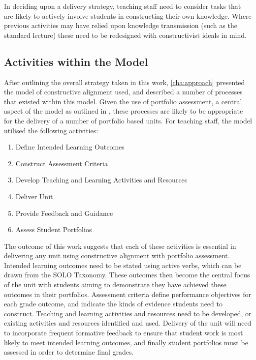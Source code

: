 In deciding upon a delivery strategy, teaching staff need to consider tasks that are likely to actively involve students in constructing their own knowledge. Where previous activities may have relied upon knowledge transmission (such as the standard lecture) these need to be redesigned with constructivist ideals in mind.



\subsection{Activities within the Model} %
\label{sub:processes_within_the_model}

After outlining the overall strategy taken in this work, \cref{cha:approach} presented the model of constructive alignment used, and described a number of processes that existed within this model. Given the use of portfolio assessment, a central aspect of the model as outlined in , these processes are likely to be appropriate for the delivery of a number of portfolio based units. For teaching staff, the model utilised the following activities:

\begin{enumerate}
	\item Define Intended Learning Outcomes
	\item Construct Assessment Criteria
	\item Develop Teaching and Learning Activities and Resources
	\item Deliver Unit
	\item Provide Feedback and Guidance
	\item Assess Student Portfolios
\end{enumerate}

The outcome of this work suggests that each of these activities is essential in delivering any unit using constructive alignment with portfolio assessment. Intended learning outcomes need to be stated using active verbs, which can be drawn from the SOLO Taxonomy. These outcomes then become the central focus of the unit with students aiming to demonstrate they have achieved these outcomes in their portfolios. Assessment criteria define performance objectives for each grade outcome, and indicate the kinds of evidence students need to construct. Teaching and learning activities and resources need to be developed, or existing activities and resources identified and used. Delivery of the unit will need to incorporate frequent formative feedback to ensure that student work is most likely to meet intended learning outcomes, and finally student portfolios must be assessed in order to determine final grades. 

